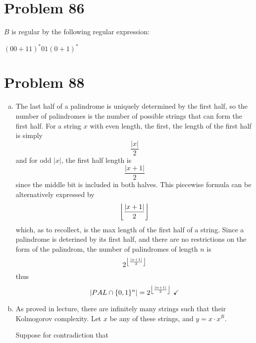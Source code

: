 \documentclass[11pt]{article}
\DeclarePairedDelimiter\floor{\lfloor}{\rfloor}
\begin{document}
\section*{Problem 86} $B$ is regular by the following regular expression: 

$(00 + 11)^* 01 (0+1)^* $


\section*{Problem 88}
\begin{enumerate}[(a)]
	\item The last half of a palindrome is uniquely determined by the first half, so the number of palindromes is the number of possible strings that can form the first half. 
	For a string $x$ with even length, the first, the length of the first half is simply 
		\[\frac{|x|}{2} \] 
	and for odd $|x|$, the first half length is
		\[\frac{|x+1|}{2} \]
	since the middle bit is included in both halves.
	This piecewise formula can be alternatively expressed by
		\[\floor*{ \frac{|x+1|}{2} } \]
	which, as to recollect, is the max length of the first half of a string.
	Since a palindrome is deterined by its first half, and there are no restrictions on the form of the palindrom, the number of palindromes of length $n$ is 
		\[2^{\floor*{ \frac{|x+1|}{2} }} \]
	thus
		\[ |PAL \cap \{0,1\}^n| = 2^{\floor*{ \frac{|n+1|}{2} }}\ \checkmark\]

	\item  As proved in lecture, there are infinitely many strings such that their Kolmogorov complexity.
	Let $x$ be any of these strings, and $y = x \cdot x^R$.

	Suppose for contradiction that 
\end{enumerate}
\end{document}
